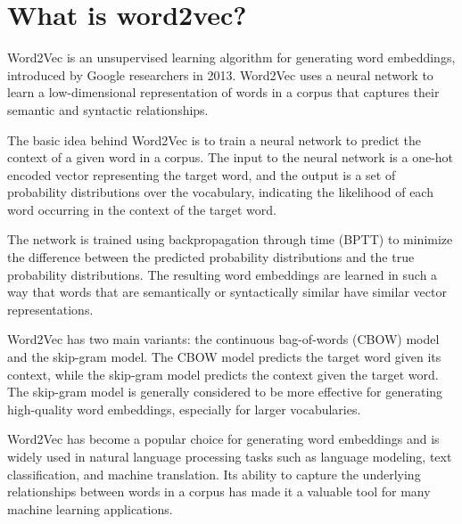 \section{What is word2vec?}
Word2Vec is an unsupervised learning algorithm for generating word embeddings, introduced by Google researchers in 2013. Word2Vec uses a neural network to learn a low-dimensional representation of words in a corpus that captures their semantic and syntactic relationships.

The basic idea behind Word2Vec is to train a neural network to predict the context of a given word in a corpus. The input to the neural network is a one-hot encoded vector representing the target word, and the output is a set of probability distributions over the vocabulary, indicating the likelihood of each word occurring in the context of the target word.

The network is trained using backpropagation through time (BPTT) to minimize the difference between the predicted probability distributions and the true probability distributions. The resulting word embeddings are learned in such a way that words that are semantically or syntactically similar have similar vector representations.

Word2Vec has two main variants: the continuous bag-of-words (CBOW) model and the skip-gram model. The CBOW model predicts the target word given its context, while the skip-gram model predicts the context given the target word. The skip-gram model is generally considered to be more effective for generating high-quality word embeddings, especially for larger vocabularies.

Word2Vec has become a popular choice for generating word embeddings and is widely used in natural language processing tasks such as language modeling, text classification, and machine translation. Its ability to capture the underlying relationships between words in a corpus has made it a valuable tool for many machine learning applications.

